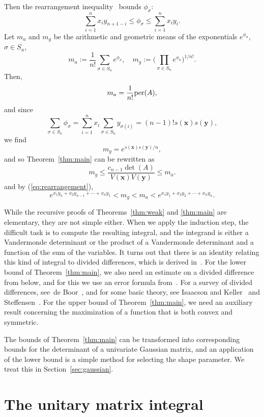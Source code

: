 \documentclass[12pt]{article}
\def\bfx{\mathbf{x}}
\def\bfy{\mathbf{y}}
\def\per{{\rm per}}
\begin{document}
Then the rearrangement inequality~\cite[Thm 368]{Hardy:1952} bounds
$\phi_\sigma$:
\begin{equation}\label{eq:rearrangement}
\sum_{i=1}^n x_i y_{n+1-i}
   \le \phi_\sigma \le \sum_{i=1}^n x_i y_{i}.
\end{equation}
Let $m_a$ and $m_g$ be the arithmetic and geometric means
of the exponentials $e^{\phi_\sigma}$, $\sigma \in S_n$,
$$
m_a := \frac{1}{n!} \sum_{\sigma \in S_n} e^{\phi_\sigma}, \quad
m_g :=
 \Big(\prod_{\sigma \in S_n} e^{\phi_\sigma} \Big)^{1/n!}. $$
Then,
$$ m_a = \frac{1}{n!} \per(A),
$$
and since
$$ \sum_{\sigma\in S_n} \phi_\sigma
= \sum_{i=1}^n x_i \sum_{\sigma\in S_n} y_{\sigma(i)}
= (n-1)! s(\bfx) s(\bfy), $$
we find
$$ m_g = e^{s(\bfx)s(\bfy)/n}, $$
and so Theorem~\ref{thm:main} can be rewritten as
$$ m_g \le \frac{c_{n-1} \det(A)}{V(\bfx)V(\bfy)} \le m_a. $$
and by (\ref{eq:rearrangement}),
$$ e^{x_1 y_n + x_2 y_{n-1} + \cdots + x_n y_1}
  < m_g < m_a < e^{x_1 y_1 + x_2 y_2 + \cdots + x_n y_n}.
$$

While the recursive proofs of Theorems~\ref{thm:weak} and \ref{thm:main}
are elementary, they are not simple either.
When we apply the induction step, 
the difficult task is to compute the resulting integral,
and the integrand is either a Vandermonde determinant or
the product of a Vandermonde determinant and a function of the
sum of the variables.
It turns out that there is an identity relating this kind of integral
to divided differences, which is derived in~\cite{Floater:2026a}.
For the lower bound of Theorem~\ref{thm:main},
we also need an estimate on
a divided difference from below, and for this we use an error
formula from~\cite{Floater:2003}.
For a survey of divided differences, see~de Boor~\cite{deBoor:2005},
and for some basic theory, see
Isaacson and Keller~\cite[Section 6.1]{Isaacson:1994}
and Steffensen~\cite{Steffensen:1927}.
For the upper bound of Theorem~\ref{thm:main},
we need an auxiliary result concerning the
maximization of a function that is both convex and symmetric.

The bounds of Theorem~\ref{thm:main}
can be transformed into corresponding bounds
for the determinant of a univariate Gaussian matrix,
and an application of the lower bound
is a simple method for selecting the shape parameter.
We treat this in Section~\ref{sec:gaussian}.

\section{The unitary matrix integral}
\end{document}
